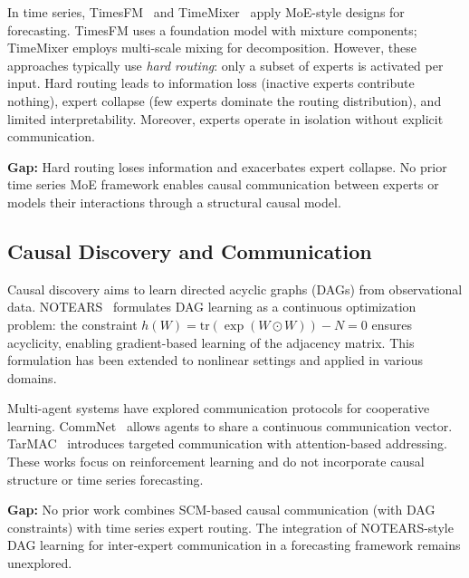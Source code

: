 In time series, TimesFM~\cite{ekambaram2023timesfm} and TimeMixer~\cite{wang2023timemixer} apply MoE-style designs for forecasting. TimesFM uses a foundation model with mixture components; TimeMixer employs multi-scale mixing for decomposition. However, these approaches typically use \emph{hard routing}: only a subset of experts is activated per input. Hard routing leads to information loss (inactive experts contribute nothing), expert collapse (few experts dominate the routing distribution), and limited interpretability. Moreover, experts operate in isolation without explicit communication.

\textbf{Gap:} Hard routing loses information and exacerbates expert collapse. No prior time series MoE framework enables causal communication between experts or models their interactions through a structural causal model.

\subsection{Causal Discovery and Communication}

Causal discovery aims to learn directed acyclic graphs (DAGs) from observational data. NOTEARS~\cite{zheng2018dags} formulates DAG learning as a continuous optimization problem: the constraint $h(W) = \text{tr}(\exp(W \odot W)) - N = 0$ ensures acyclicity, enabling gradient-based learning of the adjacency matrix. This formulation has been extended to nonlinear settings and applied in various domains.

Multi-agent systems have explored communication protocols for cooperative learning. CommNet~\cite{sukhbaatar2016learning} allows agents to share a continuous communication vector. TarMAC~\cite{das2019tarmac} introduces targeted communication with attention-based addressing. These works focus on reinforcement learning and do not incorporate causal structure or time series forecasting.

\textbf{Gap:} No prior work combines SCM-based causal communication (with DAG constraints) with time series expert routing. The integration of NOTEARS-style DAG learning for inter-expert communication in a forecasting framework remains unexplored.
